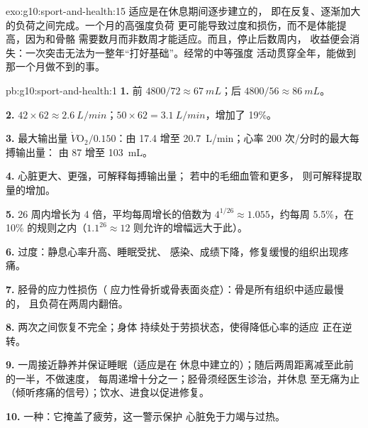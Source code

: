 \begin{solution}{exo:g10:sport-and-health:15}
适应是在休息期间逐步建立的，
即在反复、逐渐加大的负荷之间完成。一个月的高强度负荷
更可能导致过度和损伤，而不是体能提高，因为和骨骼
需要数月而非数周才能适应。而且，停止后数周内，
收益便会消失：一次突击无法为一整年“打好基础”。经常的中等强度
活动贯穿全年，能做到那一个月做不到的事。
\end{solution}

\begin{solution}{pb:g10:sport-and-health:1}
\textbf{1.} 前 $4800/72 \approx \qty{67}{mL}$；后 $4800/56 \approx
\qty{86}{mL}$。

\textbf{2.} $42 \times 62 \approx \qty{2.6}{L/min}$；$50 \times 62 =
\qty{3.1}{L/min}$，增加了 19\%。

\textbf{3.} 最大输出量 $\dot V\!\mathrm{O_2}/0.150$：由
\num{17.4} 增至 \qty{20.7}{L/min}；心率 200 次/分时的最大每搏输出量：
由 \num{87} 增至 \qty{103}{mL}。

\textbf{4.} 心脏更大、更强，可解释每搏输出量；
若中的毛细血管和更多，
则可解释提取量的增加。

\textbf{5.} 26 周内增长为 4 倍，平均每周增长的倍数为 $4^{1/26}
\approx 1.055$，约每周 5.5\%，在 10\% 的规则之内（$1.1^{26}
\approx 12$ 则允许的增幅远大于此）。

\textbf{6.} 过度：静息心率升高、睡眠受扰、
感染、成绩下降，修复缓慢的组织出现疼痛。

\textbf{7.} 胫骨的应力性损伤（
应力性骨折或骨表面炎症）：骨是所有组织中适应最慢的，
且负荷在两周内翻倍。

\textbf{8.} 两次之间恢复不完全；身体
持续处于劳损状态，使得降低心率的适应
正在逆转。

\textbf{9.} 一周接近静养并保证睡眠（适应是在
休息中建立的）；随后两周距离减至此前的一半，不做速度，
每周递增十分之一；胫骨须经医生诊治，并休息
至无痛为止（倾听疼痛的信号）；饮水、进食以促进修复。

\textbf{10.} 一种：它掩盖了疲劳，这一警示保护
心脏免于力竭与过热。


\end{solution}
